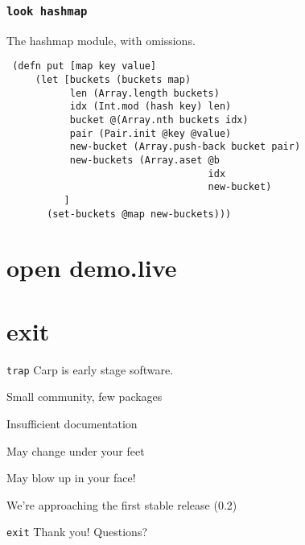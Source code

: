 \documentclass{beamer}
\begin{document}
  \begin{frame}[fragile]
    \frametitle{\texttt{look hashmap}}
    \begin{listing}[H]
      \caption{The hashmap module, with omissions.}
      \begin{verbatim}
 (defn put [map key value]
     (let [buckets (buckets map)
           len (Array.length buckets)
           idx (Int.mod (hash key) len)
           bucket @(Array.nth buckets idx)
           pair (Pair.init @key @value)
           new-bucket (Array.push-back bucket pair)
           new-buckets (Array.aset @b
                                   idx
                                   new-bucket)
          ]
       (set-buckets @map new-buckets)))
      \end{verbatim}
    \end{listing}
  \end{frame}
  \section{open demo.live}
  \section{exit}
  \begin{frame}{\texttt{trap}}
    Carp is early stage software.
    \begin{arrowlist}
      \item Small community, few packages
      \item Insufficient documentation
      \item May change under your feet
      \item May blow up in your face!
    \end{arrowlist}
    We’re approaching the first stable release (0.2)
  \end{frame}
  \begin{frame}{\texttt{exit}}
    \Huge Thank you!
    \linebreak
    \linebreak
    \linebreak
    \small Questions?
  \end{frame}
\end{document}
